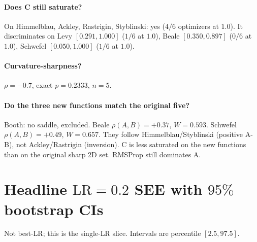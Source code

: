 \documentclass[11pt]{article}
\begin{document}
\paragraph{Does C still saturate?}
On Himmelblau, Ackley, Rastrigin, Styblinski: yes ($4/6$ optimizers at $1.0$).
It discriminates on Levy $[0.291,1.000]$ ($1/6$ at $1.0$),
Beale $[0.350,0.897]$ ($0/6$ at $1.0$),
Schwefel $[0.050,1.000]$ ($1/6$ at $1.0$).

\paragraph{Curvature-sharpness?}
$\rho=-0.7$, exact $p=0.2333$, $n=5$.

\paragraph{Do the three new functions match the original five?}
Booth: no saddle, excluded. Beale $\rho(A,B)=+0.37$, $W=0.593$.
Schwefel $\rho(A,B)=+0.49$, $W=0.657$.
They follow Himmelblau/Styblinski (positive A-B), not Ackley/Rastrigin
(inversion). C is less saturated on the new functions than on the original
sharp 2D set. RMSProp still dominates A.

\section{Headline $\mathrm{LR}=0.2$ SEE with $95\%$ bootstrap CIs}

Not best-LR; this is the single-LR slice. Intervals are percentile $[2.5,97.5]$.
\end{document}
